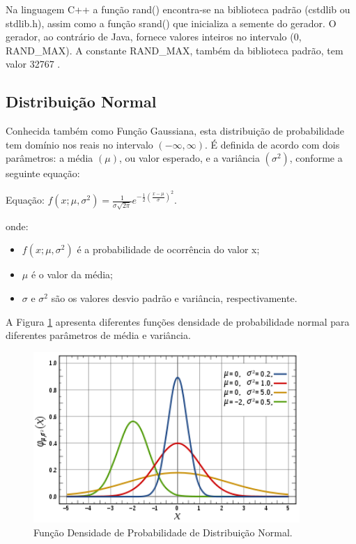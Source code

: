 Na linguagem C++ a função rand() encontra-se na biblioteca padrão (cstdlib ou stdlib.h), assim como a função srand() que inicializa a semente do gerador. O gerador, ao contrário de Java, fornece valores inteiros no intervalo (0, RAND\_MAX). A constante RAND\_MAX, também da biblioteca padrão, tem valor 32767 \cite{cppreference}.

\subsection{Distribuição Normal}

Conhecida também como Função Gaussiana, esta distribuição de probabilidade tem domínio nos reais no intervalo \((-\infty, \infty)\). É definida de acordo com dois parâmetros: a média \((\mu)\), ou valor esperado, e a variância \((\sigma^{2})\), conforme a seguinte equação:

Equação: \(f(x; \mu, \sigma^2) = \frac{1}{\sigma\sqrt{2\pi}}e^{-\frac{1}{2}(\frac{x - \mu}{\sigma})^2}\).

onde:
\begin{itemize}
	\item \(f(x; \mu, \sigma^2)\) é a probabilidade de ocorrência do valor x;
	\item \(\mu\) é o valor da média;
	\item \(\sigma\) e \(\sigma^{2}\) são os valores desvio padrão e variância, respectivamente.
\end{itemize}

A Figura \ref{fig:normaldist} apresenta diferentes funções densidade de probabilidade normal para diferentes parâmetros de média e variância.

\begin{figure}[!htb]
	\centering
	\includegraphics[width=0.9\textwidth]{./imgs/normaldist.png}
	\caption{Função Densidade de Probabilidade de Distribuição Normal.}
	\label{fig:normaldist}
\end{figure}

